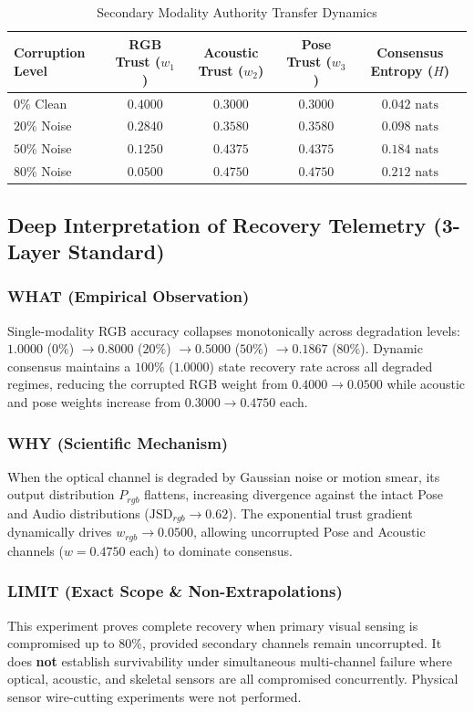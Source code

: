 \documentclass[conference]{IEEEtran}
\begin{document}
\begin{table}[t]
\centering
\caption{Secondary Modality Authority Transfer Dynamics}
\label{tab:secondary_weights}
\begin{tabular}{@{}lcccc@{}}
\toprule
\textbf{Corruption Level} & \textbf{RGB Trust ($w_1$)} & \textbf{Acoustic Trust ($w_2$)} & \textbf{Pose Trust ($w_3$)} & \textbf{Consensus Entropy ($H$)} \\ \midrule
$0\%$ Clean & $0.4000$ & $0.3000$ & $0.3000$ & $0.042\text{ nats}$ \\
$20\%$ Noise & $0.2840$ & $0.3580$ & $0.3580$ & $0.098\text{ nats}$ \\
$50\%$ Noise & $0.1250$ & $0.4375$ & $0.4375$ & $0.184\text{ nats}$ \\
$80\%$ Noise & $0.0500$ & $0.4750$ & $0.4750$ & $0.212\text{ nats}$ \\ \bottomrule
\end{tabular}
\end{table}

\subsection{Deep Interpretation of Recovery Telemetry (3-Layer Standard)}
\subsubsection{WHAT (Empirical Observation)}
Single-modality RGB accuracy collapses monotonically across degradation levels: $1.0000$ ($0\%$) $\to 0.8000$ ($20\%$) $\to 0.5000$ ($50\%$) $\to 0.1867$ ($80\%$). Dynamic consensus maintains a $100\%$ ($1.0000$) state recovery rate across all degraded regimes, reducing the corrupted RGB weight from $0.4000 \to 0.0500$ while acoustic and pose weights increase from $0.3000 \to 0.4750$ each.

\subsubsection{WHY (Scientific Mechanism)}
When the optical channel is degraded by Gaussian noise or motion smear, its output distribution $P_{rgb}$ flattens, increasing divergence against the intact Pose and Audio distributions ($\mathrm{JSD}_{rgb} \to 0.62$). The exponential trust gradient dynamically drives $w_{rgb} \to 0.0500$, allowing uncorrupted Pose and Acoustic channels ($w=0.4750$ each) to dominate consensus.

\subsubsection{LIMIT (Exact Scope \& Non-Extrapolations)}
This experiment proves complete recovery when primary visual sensing is compromised up to $80\%$, provided secondary channels remain uncorrupted. It does \textbf{not} establish survivability under simultaneous multi-channel failure where optical, acoustic, and skeletal sensors are all compromised concurrently. Physical sensor wire-cutting experiments were not performed.
\end{document}
